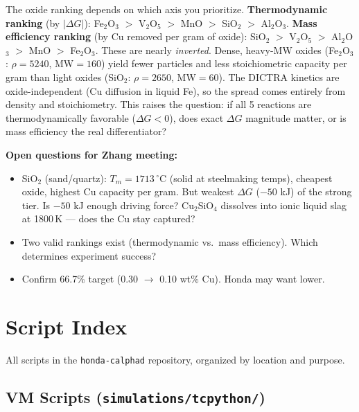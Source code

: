 \documentclass[11pt]{article}
\begin{document}
\begin{insight}
The oxide ranking depends on which axis you prioritize. \textbf{Thermodynamic ranking} (by $|\Delta G|$): Fe$_2$O$_3$ $>$ V$_2$O$_5$ $>$ MnO $>$ SiO$_2$ $>$ Al$_2$O$_3$. \textbf{Mass efficiency ranking} (by Cu removed per gram of oxide): SiO$_2$ $>$ V$_2$O$_5$ $>$ Al$_2$O$_3$ $>$ MnO $>$ Fe$_2$O$_3$. These are nearly \textit{inverted}. Dense, heavy-MW oxides (Fe$_2$O$_3$: $\rho=5240$, MW$=160$) yield fewer particles and less stoichiometric capacity per gram than light oxides (SiO$_2$: $\rho=2650$, MW$=60$). The DICTRA kinetics are oxide-independent (Cu diffusion in liquid Fe), so the spread comes entirely from density and stoichiometry. This raises the question: if all 5 reactions are thermodynamically favorable ($\Delta G < 0$), does exact $\Delta G$ magnitude matter, or is mass efficiency the real differentiator?
\end{insight}

\textbf{Open questions for Zhang meeting:}
\begin{itemize}[leftmargin=*]
    \item SiO$_2$ (sand/quartz): $T_m = 1713$\,$^\circ$C (solid at steelmaking temps), cheapest oxide, highest Cu capacity per gram. But weakest $\Delta G$ ($-50$ kJ) of the strong tier. Is $-50$ kJ enough driving force? Cu$_2$SiO$_4$ dissolves into ionic liquid slag at 1800\,K --- does the Cu stay captured?
    \item Two valid rankings exist (thermodynamic vs.\ mass efficiency). Which determines experiment success?
    \item Confirm 66.7\% target (0.30 $\to$ 0.10 wt\% Cu). Honda may want lower.
\end{itemize}


\newpage
\section{Script Index}
\label{sec:script_index}

All scripts in the \texttt{honda-calphad} repository, organized by location and purpose.

\subsection{VM Scripts (\texttt{simulations/tcpython/})}
\end{document}
